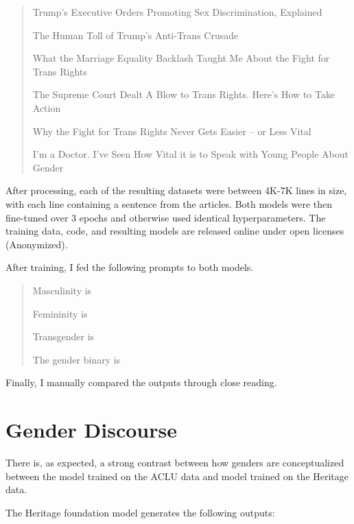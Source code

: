 \documentclass{article}
\begin{document}
\begin{quote}

Trump's Executive Orders Promoting Sex Discrimination, Explained

The Human Toll of Trump's Anti-Trans Crusade

What the Marriage Equality Backlash Taught Me About the Fight for Trans Rights

The Supreme Court Dealt A Blow to Trans Rights. Here's How to Take Action

Why the Fight for Trans Rights Never Gets Easier – or Less Vital

I'm a Doctor. I've Seen How Vital it is to Speak with Young People About Gender

\end{quote}

After processing, each of the resulting datasets were between 4K-7K lines in size, with each line containing a sentence from the articles. Both models were then fine-tuned over 3 epochs and otherwise used identical hyperparameters. The training data, code, and resulting models are released online under open licenses (Anonymized).

After training, I fed the following prompts to both models.

\begin{quote}

Masculinity is

Femininity is

Transgender is

The gender binary is

\end{quote}

Finally, I manually compared the outputs through close reading.

\section{Gender Discourse}

There is, as expected, a strong contrast between how genders are conceptualized between the model trained on the ACLU data and model trained on the Heritage data.

The Heritage foundation model generates the following outputs:
\end{document}
